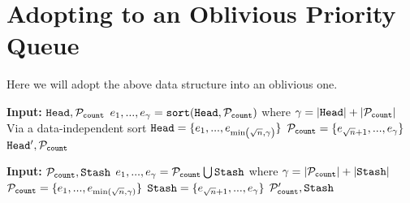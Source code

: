 \section{Adopting to an Oblivious Priority Queue}
Here we will adopt the above data structure into an oblivious one.

\newcommand{\DIPQOperation}{\texttt{Operation}}

\begin{algorithm}
	\caption{$\MergeFill$}
	\begin{algorithmic}[1]
			\State \textbf{Input:} $\texttt{Head}, \mathcal{P}_{\texttt{count}}$
			\State $e_1, ..., e_\gamma = \texttt{sort}(\texttt{Head}, \mathcal{P}_{\texttt{count}})$ where $\gamma = |\texttt{Head}| + |\mathcal{P}_{\texttt{count}}|$ \Comment Via a data-independent sort
			\State $\texttt{Head} = \{e_1, ..., e_{\min\left({\sqrt{n}}, \gamma\right)}\}$
			\State $\mathcal{P}_{\texttt{count}} = \{e_{{\sqrt{n}} + 1}, ..., e_\gamma\}$
			\State \Return $\texttt{Head}', \mathcal{P}_{\texttt{count}}$
	\end{algorithmic}
\end{algorithm}

\begin{algorithm}
	\caption{$\Fill$}
	\begin{algorithmic}[1]
			\State \textbf{Input:} $\mathcal{P}_{\texttt{count}}, \texttt{Stash}$
			\State $e_1, ..., e_\gamma = \mathcal{P}_{\texttt{count}} \bigcup \texttt{Stash}$ where $\gamma = |\mathcal{P}_{\texttt{count}}| + |\texttt{Stash}|$
			\State $\mathcal{P}_{\texttt{count}} = \{e_1, ..., e_{\min({\sqrt{n}}, \gamma)}\}$
			\State $\texttt{Stash} = \{e_{{\sqrt{n}} + 1}, ..., e_\gamma\}$
			\State \Return $\mathcal{P}_{\texttt{count}}', \texttt{Stash}$
	\end{algorithmic}
\end{algorithm}


